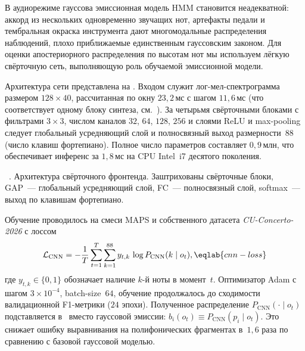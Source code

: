 %
В аудиорежиме гауссова эмиссионная модель HMM становится неадекватной:
аккорд из нескольких одновременно звучащих нот, артефакты педали и
тембральная окраска инструмента дают многомодальные распределения
наблюдений, плохо приближаемые единственным гауссовским законом. Для
оценки апостериорного распределения по высотам нот мы используем
лёгкую свёрточную сеть, выполняющую роль обучаемой эмиссионной модели.

Архитектура сети представлена на . Входом служит
лог-мел-спектрограмма размером $128\times 40$, рассчитанная по окну
$23{,}2$\,мс с шагом $11{,}6$\,мс (что соответствует одному
блоку синтеза, см.~). За четырьмя свёрточными
блоками с фильтрами $3\times 3$, числом каналов $32$, $64$, $128$,
$256$ и слоями ReLU и max-pooling следует глобальный усредняющий
слой и полносвязный выход размерности~$88$ (число клавиш фортепиано).
Полное число параметров составляет $0{,}9$\,млн, что обеспечивает
инференс за $1{,}8$\,мс на CPU Intel~i7 десятого поколения.

\par\addvspace{2pt}
{\centering
{}%
\resizebox{\columnwidth}{!}{}\par
\vspace{2pt}
\footnotesize
\figurename~\thefigure. Архитектура свёрточного фронтенда.
Заштрихованы свёрточные блоки, GAP~--- глобальный усредняющий слой,
FC~--- полносвязный слой, softmax~--- выход по клавишам фортепиано.\par}
\addvspace{4pt}

Обучение проводилось на смеси MAPS и собственного датасета
\textit{CU-Concerto-2026} с лоссом
\begin{equation}
\mathcal{L}_{\text{CNN}} = -\frac{1}{T}\sum_{t=1}^{T}
\sum_{k=1}^{88} y_{t,k}\,\log P_{\text{CNN}}(k\mid o_t),
\eqlab{cnn-loss}
\end{equation}
где $y_{t,k}\in\{0,1\}$ обозначает наличие $k$-й ноты в момент~$t$.
Оптимизатор Adam с шагом $3\!\times\!10^{-4}$, batch-size~$64$,
обучение продолжалось до сходимости валидационной F1-метрики
($24$ эпохи). Полученное распределение $P_{\text{CNN}}(\cdot\mid o_t)$
подставляется в~ вместо гауссовой эмиссии:
$b_i(o_t)\equiv P_{\text{CNN}}(p_i\mid o_t)$. Это снижает ошибку
выравнивания на полифонических фрагментах в~$1{,}6$ раза по
сравнению с базовой гауссовой моделью.

